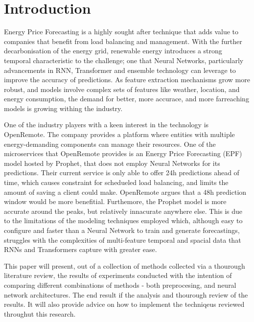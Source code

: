\section{Introduction}

Energy Price Forecasting is a highly sought after technique that adds value to companies that benefit from load balancing and management. With the further decarbonisation of the energy grid, renewable energy introduces
a strong temporal characteristic to the challenge; one that Neural Networks, particularly advancements in RNN\cite{Aksu2026,Xu2025,Shao2021,Fang2023,Manero2018}, Transformer\cite{Kong2025,Wang2026,Oliveira2023,9756020} and ensemble\cite{math11030676,CHEN2025126302,Hussan2026-dy} technology can leverage to improve the accuracy of predictions. As feature extraction mechanisms grow more robust\cite{CHEN2025126302,Aksu2026,Xu2025,4494757,Shao2021},
and models involve complex sets of features like weather\cite{9788043, Wang2026}, location, and energy consumption\cite{4494757}, the demand for better, more accurace, and more farreaching models is growing withing the industry.

One of the industry players with a keen interest in the technology is OpenRemote. The company provides a platform where entities with multiple energy-demanding components can manage their resources. One of the microservices
that OpenRemote provides is an Energy Price Forecasting (EPF) model hosted by Prophet, that does not employ Neural Networks for its predictions\cite{Taylor2017}. Their current service is only able to offer 24h
predictions ahead of time, which causes constraint for schedueled load balancing, and limits the amount of saving a client could make. OpenRemote argues that a 48h prediction window would be more benefitial. Furthemore, the Prophet model is more accurate around the peaks, but 
relatively innacurate anywhere else. This is due to the limitations of the modeling techniques employed which, although easy to configure and faster than a Neural Network to train and generate forecastings, struggles 
with the complexities of multi-feature temporal and spacial data that RNNs and Transformers capture with greater ease.

This paper will present, out of a collection of methods collected via a thourough literature review, the results of experiments conducted with the intention of comparing
different combinations of methods - both preprocesing, and neural network architectures. The end result if the analysis and thourough review of the results. It will also provide
advice on how to implement the techniqeus reviewed throughut this research.